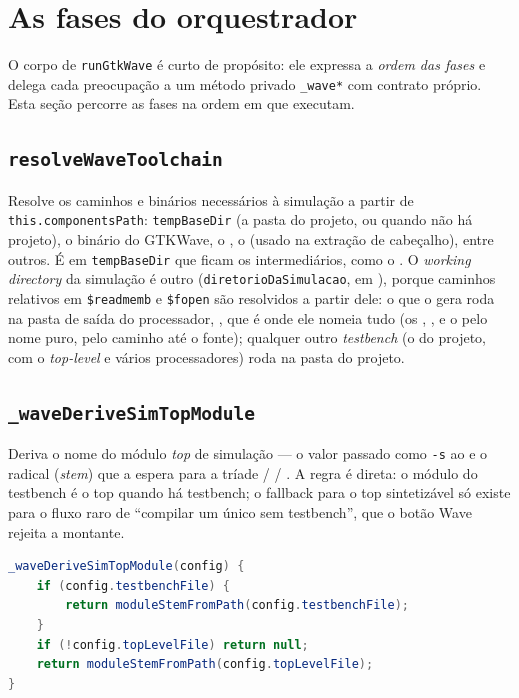 \section{As fases do orquestrador}

O corpo de \lstinline|runGtkWave| é curto de propósito: ele expressa a
\emph{ordem das fases} e delega cada preocupação a um método privado
\lstinline|_wave*| com contrato próprio. Esta seção percorre as fases na ordem
em que executam.

\subsection{\texttt{resolveWaveToolchain}}

Resolve os caminhos e binários necessários à simulação a partir de
\lstinline|this.componentsPath|: \lstinline|tempBaseDir| (a pasta
 do projeto, ou  quando não há
projeto), o binário do GTKWave, o , o  (usado na
extração de cabeçalho), entre outros. É em \lstinline|tempBaseDir| que ficam os
intermediários, como o . O \emph{working directory} da simulação é
outro (\lstinline|diretorioDaSimulacao|, em ),
porque caminhos relativos em \lstinline|$readmemb| e \lstinline|$fopen| são
resolvidos a partir dele: o  que o  gera roda na
pasta de saída do processador, , que é onde ele
nomeia tudo (os , ,  e o
 pelo nome puro,  pelo caminho até o fonte);
qualquer outro \emph{testbench} (o do projeto, com o \emph{top-level} e vários
processadores) roda na pasta do projeto.

\subsection{\texttt{\_waveDeriveSimTopModule}}

Deriva o nome do módulo \emph{top} de simulação --- o valor passado como
\lstinline|-s| ao  e o radical (\emph{stem}) que a 
espera para a tríade  /  / . A regra é
direta: o módulo do testbench é o top quando há testbench; o fallback para o
top sintetizável só existe para o fluxo raro de \enquote{compilar um único
 sem testbench}, que o botão Wave rejeita a montante.

\begin{lstlisting}[language=Java,caption={Derivação do módulo top de simulação.}]
_waveDeriveSimTopModule(config) {
    if (config.testbenchFile) {
        return moduleStemFromPath(config.testbenchFile);
    }
    if (!config.topLevelFile) return null;
    return moduleStemFromPath(config.topLevelFile);
}
\end{lstlisting}

